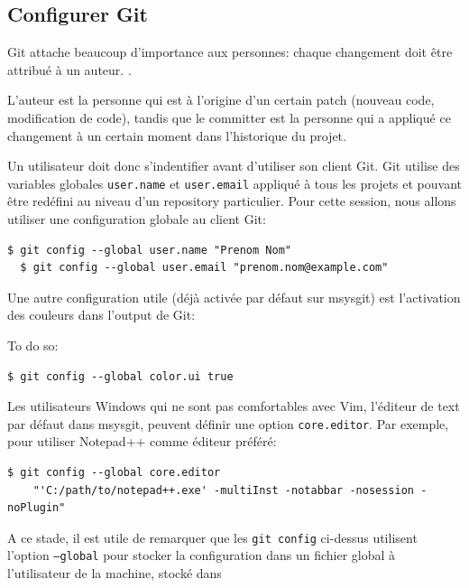\documentclass[a4paper]{../../common/tufte-latex/tufte-handout}
\begin{document}
\subsection{Configurer Git}

Git attache beaucoup d'importance aux personnes: chaque changement doit être attribué à un auteur. 
.

L'auteur est la personne qui est à l'origine d'un certain patch (nouveau code, modification de code), tandis que le committer est la personne qui a appliqué ce changement à un certain moment dans l'historique du projet.

Un utilisateur doit donc s'indentifier avant d'utiliser son client Git.
Git utilise des variables globales \texttt{user.name} et \texttt{user.email} appliqué à tous les projets et pouvant être redéfini au niveau d'un repository particulier.
Pour cette session, nous allons utiliser une configuration globale au client Git:

\begin{lstlisting}[style=BashInputStyle]
  $ git config --global user.name "Prenom Nom"
  $ git config --global user.email "prenom.nom@example.com"
\end{lstlisting}

Une autre configuration utile (déjà activée par défaut sur msysgit) est l'activation des couleurs dans l'output de Git:

\noindent To do so:

\begin{lstlisting}[style=BashInputStyle]
  $ git config --global color.ui true
\end{lstlisting}

Les utilisateurs Windows qui ne sont pas comfortables avec Vim, l'éditeur de text par défaut dans msysgit, peuvent définir une option \texttt{core.editor}.
Par exemple, pour utiliser Notepad++ comme éditeur préféré:

\begin{lstlisting}[style=BashInputStyle]
  $ git config --global core.editor
    "'C:/path/to/notepad++.exe' -multiInst -notabbar -nosession -noPlugin"
\end{lstlisting}

A ce stade, il est utile de remarquer que les \texttt{git config} ci-dessus utilisent l'option \texttt{--global}  pour stocker la configuration dans un fichier global à l'utilisateur de la machine, stocké dans 
\end{document}
